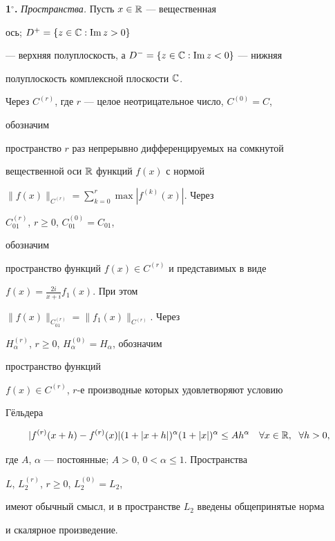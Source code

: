  


{\bf 1${}^\circ$.} {\it Пространства.} Пусть $x\in \Bbb R$ --- вещественная 


ось; $D^+=\{z\in\Bbb C:\operatorname{Im} z>0\}$ 


--- верхняя полуплоскость, а $D^-=\{z\in\Bbb C:\operatorname{Im} z<0\}$ --- нижняя 


полуплоскость комплексной плоскости $\Bbb C$. 


 


Через $C^{(r)}$, где $r$ --- целое неотрицательное число, $C^{(0)}=C$, 


обозначим 


пространство $r$ раз непрерывно дифференцируемых на сомкнутой 


вещественной оси $\Bbb R$ функций $f(x)$ с нормой 


$\|f(x)\|_{C^{(r)}}=\sum\limits^r_{k=0}\max|f^{(k)}(x)|$. Через 


$C^{(r)}_{01}$, $r\ge 0$, $C^{(0)}_{01}=C_{01}$,


обозначим 


пространство функций $f(x)\in C^{(r)}$ и представимых в виде 


$f(x)=\frac{2i}{x+i}f_1(x)$. При этом 


$\|f(x)\|_{C^{(r)}_{01}}=\|f_1(x)\|_{C^{(r)}}$. Через 


$H^{(r)}_\alpha$, $r\ge 0$, $H^{(0)}_\alpha=H_\alpha$, обозначим 


пространство функций 


$f(x)\in C^{(r)}$, $r$-е производные которых удовлетворяют условию 


Г\"ельдера \cite{4} 


$$ 


|f^{(r)}(x+h)-f^{(r)}(x)|(1+|x+h|)^\alpha 


(1+|x|)^\alpha\le A h^\alpha\quad \forall x\in \Bbb R,\ \; 


\forall h>0, 


$$ 


где $A$, $\alpha$ --- постоянные; $A>0$, $0<\alpha\le 1$. Пространства 


$L$, $L^{(r)}_2$, $r\ge 0$, $L^{(0)}_2=L_2$, 


имеют обычный смысл, и в пространстве $L_2$ введены общепринятые норма 


и скалярное произведение. 


\medskip 


 


